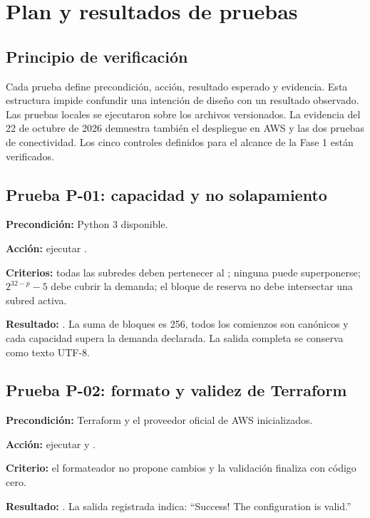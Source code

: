 \chapter{Plan y resultados de pruebas}

\section{Principio de verificación}

Cada prueba define precondición, acción, resultado esperado y evidencia. Esta estructura impide confundir una intención de diseño con un resultado observado. Las pruebas locales se ejecutaron sobre los archivos versionados. La evidencia del 22 de octubre de 2026 demuestra también el despliegue en AWS y las dos pruebas de conectividad. Los cinco controles definidos para el alcance de la Fase 1 están verificados.

\section{Prueba P-01: capacidad y no solapamiento}

\textbf{Precondición:} Python 3 disponible.

\textbf{Acción:} ejecutar .

\textbf{Criterios:} todas las subredes deben pertenecer al ; ninguna puede superponerse; $2^{32-p}-5$ debe cubrir la demanda; el bloque de reserva no debe intersectar una subred activa.

\textbf{Resultado:} \statusok. La suma de bloques es 256, todos los comienzos son canónicos y cada capacidad supera la demanda declarada. La salida completa se conserva como texto UTF-8.

\section{Prueba P-02: formato y validez de Terraform}

\textbf{Precondición:} Terraform y el proveedor oficial de AWS inicializados.

\textbf{Acción:} ejecutar  y .

\textbf{Criterio:} el formateador no propone cambios y la validación finaliza con código cero.

\textbf{Resultado:} \statusok. La salida registrada indica: ``Success! The configuration is valid.''

